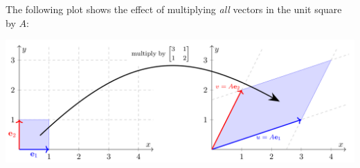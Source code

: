 \documentclass[10pt]{article}
\theoremstyle{definition}
\begin{document}
The following plot shows the effect of multiplying \textit{all} vectors in the
unit square by $A$:
\begin{center}
  \includegraphics[scale=.3]{images/linear-transform-first-example}

      



\end{center}
\end{document}
